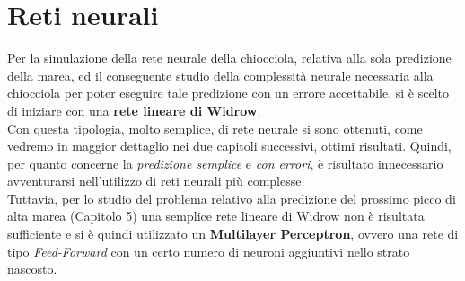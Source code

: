 \chapter{Reti neurali}
	Per la simulazione della rete neurale della chiocciola, relativa alla sola predizione della marea, ed il conseguente studio della complessità neurale necessaria alla chiocciola per poter eseguire tale predizione con un errore accettabile, si è scelto di iniziare con una \textbf{rete lineare di Widrow}.\\
	Con questa tipologia, molto semplice, di rete neurale si sono ottenuti, come vedremo in maggior dettaglio nei due capitoli successivi, ottimi risultati. Quindi, per quanto concerne la \textit{predizione semplice} e \textit{con errori}, è risultato innecessario avventurarsi nell'utilizzo di reti neurali più complesse.\\
	Tuttavia, per lo studio del problema relativo alla predizione del prossimo picco di alta marea (Capitolo 5) una semplice rete lineare di Widrow non è risultata sufficiente e si è quindi utilizzato un \textbf{Multilayer Perceptron}, ovvero una rete di tipo \textit{Feed-Forward} con un certo numero di neuroni aggiuntivi nello strato nascosto.

